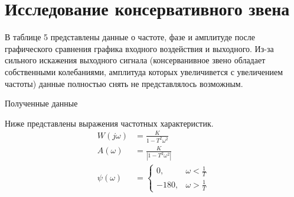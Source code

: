 \documentclass[a4paper, 11pt]{article}
\begin{document}
\newpage
\section{Исследование консервативного звена}
В таблице 5 представлены данные о частоте, фазе и амплитуде после графического сравнения графика входного воздействия и выходного. Из-за сильного искажения выходного сигнала (консерванивное звено обладает собственными колебаниями, амплитуда которых увеличивется с увеличением частоты) данные полностью снять не представлялось возможным. \par
\begin{table}[h!]
    \centering
    \begin{threeparttable}
        \caption{Полученные данные}
    \end{threeparttable}
\end{table}

Ниже представлены выражения частотных характеристик.
\begin{align}
    W(j\omega) & = \frac{K}{1 - T^2\omega^2} \\
    A(\omega) & = \frac{K}{|1 - T^2\omega^2|} \\ 
    \psi(\omega) & = \begin{cases}
        0, & \omega < \frac{1}{T} \\
        -180, & \omega > \frac{1}{T}
    \end{cases}
\end{align}
\end{document}
